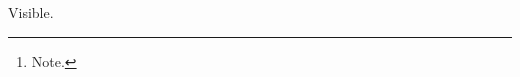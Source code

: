 \documentclass[paper=A4]{ropas-poster}
\author{Wrong\footnote{Note.}}
\begin{document}
Visible.
\end{document}
